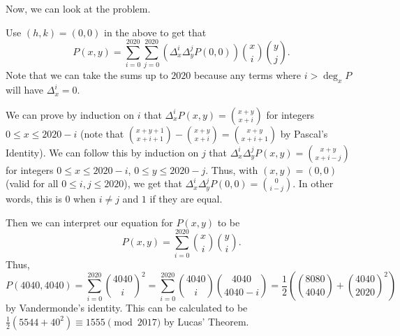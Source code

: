 Now, we can look at the problem.

Use $\left(h,k\right)=\left(0,0\right)$ in the above to get that \[P\left(x,y\right)=\displaystyle\sum_{i=0}^{2020}\displaystyle\sum_{j=0}^{2020}\left(\Delta_x^i\Delta_y^jP\left(0,0\right)\right)\binom{x}{i}\binom{y}{j}.\] Note that we can take the sums up to $2020$ because any terms where $i>\deg_xP$ will have $\Delta_x^i=0$.

We can prove by induction on $i$ that $\Delta_x^iP\left(x,y\right)=\binom{x+y}{x+i}$ for integers $0\leq x\leq2020-i$ (note that $\binom{x+y+1}{x+i+1}-\binom{x+y}{x+i}=\binom{x+y}{x+i+1}$ by Pascal's Identity). We can follow this by induction on $j$ that $\Delta_x^i\Delta_y^jP\left(x,y\right)=\binom{x+y}{x+i-j}$ for integers $0\leq x\leq2020-i$, $0\leq y\leq2020-j$. Thus, with $\left(x,y\right)=\left(0,0\right)$ (valid for all $0\leq i,j\leq2020$), we get that $\Delta_x^i\Delta_y^jP\left(0,0\right)=\binom{0}{i-j}$. In other words, this is $0$ when $i\neq j$ and $1$ if they are equal.

Then we can interpret our equation for $P\left(x,y\right)$ to be \[P\left(x,y\right)=\displaystyle\sum_{i=0}^{2020}\binom{x}{i}\binom{y}{i}.\] Thus, \[P\left(4040,4040\right)=\displaystyle\sum_{i=0}^{2020}\binom{4040}{i}^2=\displaystyle\sum_{i=0}^{2020}\binom{4040}{i}\binom{4040}{4040-i}=\frac{1}{2}\left(\binom{8080}{4040}+\binom{4040}{2020}^2\right)\] by Vandermonde's identity. This can be calculated to be $\frac{1}{2}\left(5544+40^2\right)\equiv\boxed{1555}\pmod{2017}$ by Lucas' Theorem.